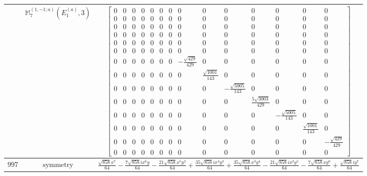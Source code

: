 \documentclass[fleqn,8pt,landscape]{jsarticle}
\begin{document}
\begin{longtable}{ccc}
$  $ & $ \mathbb{M}_{7}^{(1,-1;a)}(E_{1}^{(a)},3) $ & $ \begin{bmatrix} 0 & 0 & 0 & 0 & 0 & 0 & 0 & 0 & 0 & 0 & 0 & 0 & 0 & 0 \\ 0 & 0 & 0 & 0 & 0 & 0 & 0 & 0 & 0 & 0 & 0 & 0 & 0 & 0 \\ 0 & 0 & 0 & 0 & 0 & 0 & 0 & 0 & 0 & 0 & 0 & 0 & 0 & 0 \\ 0 & 0 & 0 & 0 & 0 & 0 & 0 & 0 & 0 & 0 & 0 & 0 & 0 & 0 \\ 0 & 0 & 0 & 0 & 0 & 0 & 0 & 0 & 0 & 0 & 0 & 0 & 0 & 0 \\ 0 & 0 & 0 & 0 & 0 & 0 & 0 & 0 & 0 & 0 & 0 & 0 & 0 & 0 \\ 0 & 0 & 0 & 0 & 0 & 0 & 0 & - \frac{\sqrt{429}}{429} & 0 & 0 & 0 & 0 & 0 & 0 \\ 0 & 0 & 0 & 0 & 0 & 0 & 0 & 0 & \frac{\sqrt{1001}}{143} & 0 & 0 & 0 & 0 & 0 \\ 0 & 0 & 0 & 0 & 0 & 0 & 0 & 0 & 0 & - \frac{\sqrt{5005}}{143} & 0 & 0 & 0 & 0 \\ 0 & 0 & 0 & 0 & 0 & 0 & 0 & 0 & 0 & 0 & \frac{5 \sqrt{3003}}{429} & 0 & 0 & 0 \\ 0 & 0 & 0 & 0 & 0 & 0 & 0 & 0 & 0 & 0 & 0 & - \frac{\sqrt{5005}}{143} & 0 & 0 \\ 0 & 0 & 0 & 0 & 0 & 0 & 0 & 0 & 0 & 0 & 0 & 0 & \frac{\sqrt{1001}}{143} & 0 \\ 0 & 0 & 0 & 0 & 0 & 0 & 0 & 0 & 0 & 0 & 0 & 0 & 0 & - \frac{\sqrt{429}}{429} \\ 0 & 0 & 0 & 0 & 0 & 0 & 0 & 0 & 0 & 0 & 0 & 0 & 0 & 0 \end{bmatrix} $ \\ \hline
$ 997 $ & $ \text{symmetry} $ & $ \frac{\sqrt{858} x^{7}}{64} - \frac{7 \sqrt{858} i x^{6} y}{64} - \frac{21 \sqrt{858} x^{5} y^{2}}{64} + \frac{35 \sqrt{858} i x^{4} y^{3}}{64} + \frac{35 \sqrt{858} x^{3} y^{4}}{64} - \frac{21 \sqrt{858} i x^{2} y^{5}}{64} - \frac{7 \sqrt{858} x y^{6}}{64} + \frac{\sqrt{858} i y^{7}}{64} $ \\

\end{longtable}
\end{document}
